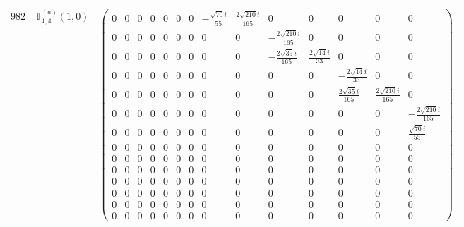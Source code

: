 \documentclass[fleqn,8pt,landscape]{jsarticle}
\begin{document}
\begin{center}
\begin{longtable}{ccc}
$ 982 $ & $ \mathbb{T}_{4,4}^{(a)}(1,0) $ & $ \begin{pmatrix} 0 & 0 & 0 & 0 & 0 & 0 & 0 & - \frac{\sqrt{70} i}{55} & \frac{2 \sqrt{210} i}{165} & 0 & 0 & 0 & 0 & 0 \\ 0 & 0 & 0 & 0 & 0 & 0 & 0 & 0 & 0 & - \frac{2 \sqrt{210} i}{165} & 0 & 0 & 0 & 0 \\ 0 & 0 & 0 & 0 & 0 & 0 & 0 & 0 & 0 & - \frac{2 \sqrt{35} i}{165} & \frac{2 \sqrt{14} i}{33} & 0 & 0 & 0 \\ 0 & 0 & 0 & 0 & 0 & 0 & 0 & 0 & 0 & 0 & 0 & - \frac{2 \sqrt{14} i}{33} & 0 & 0 \\ 0 & 0 & 0 & 0 & 0 & 0 & 0 & 0 & 0 & 0 & 0 & \frac{2 \sqrt{35} i}{165} & \frac{2 \sqrt{210} i}{165} & 0 \\ 0 & 0 & 0 & 0 & 0 & 0 & 0 & 0 & 0 & 0 & 0 & 0 & 0 & - \frac{2 \sqrt{210} i}{165} \\ 0 & 0 & 0 & 0 & 0 & 0 & 0 & 0 & 0 & 0 & 0 & 0 & 0 & \frac{\sqrt{70} i}{55} \\ 0 & 0 & 0 & 0 & 0 & 0 & 0 & 0 & 0 & 0 & 0 & 0 & 0 & 0 \\ 0 & 0 & 0 & 0 & 0 & 0 & 0 & 0 & 0 & 0 & 0 & 0 & 0 & 0 \\ 0 & 0 & 0 & 0 & 0 & 0 & 0 & 0 & 0 & 0 & 0 & 0 & 0 & 0 \\ 0 & 0 & 0 & 0 & 0 & 0 & 0 & 0 & 0 & 0 & 0 & 0 & 0 & 0 \\ 0 & 0 & 0 & 0 & 0 & 0 & 0 & 0 & 0 & 0 & 0 & 0 & 0 & 0 \\ 0 & 0 & 0 & 0 & 0 & 0 & 0 & 0 & 0 & 0 & 0 & 0 & 0 & 0 \\ 0 & 0 & 0 & 0 & 0 & 0 & 0 & 0 & 0 & 0 & 0 & 0 & 0 & 0 \end{pmatrix} $ \\ \hline

\end{longtable}
\end{center}
\end{document}
